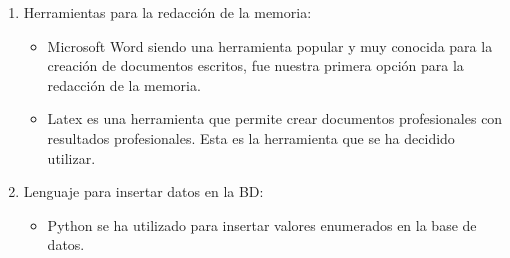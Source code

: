 \documentclass[11pt]{book}
\begin{document}
\begin{enumerate}
\begin{itemize}
	\end{itemize}
	\item Herramientas para la redacción de la memoria:
	\begin{itemize} 
		\item Microsoft Word siendo una herramienta popular y muy conocida para la creación de documentos escritos, fue nuestra primera opción para la redacción de la memoria.
		\item Latex es una herramienta que permite crear documentos profesionales con resultados profesionales. Esta es la herramienta que se ha decidido utilizar.
	\end{itemize}
	\item Lenguaje para insertar datos en la BD:
	\begin{itemize} 
		\item Python se ha utilizado para insertar valores enumerados en la base de datos.
	\end{itemize}
\end{enumerate}
\end{document}
